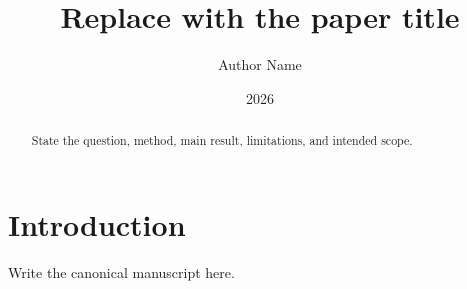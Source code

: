 \documentclass[11pt]{article}
\title{Replace with the paper title}
\author{Author Name}
\date{2026}
\begin{document}
\maketitle

\begin{abstract}
State the question, method, main result, limitations, and intended scope.
\end{abstract}

\section{Introduction}
Write the canonical manuscript here.



\end{document}

